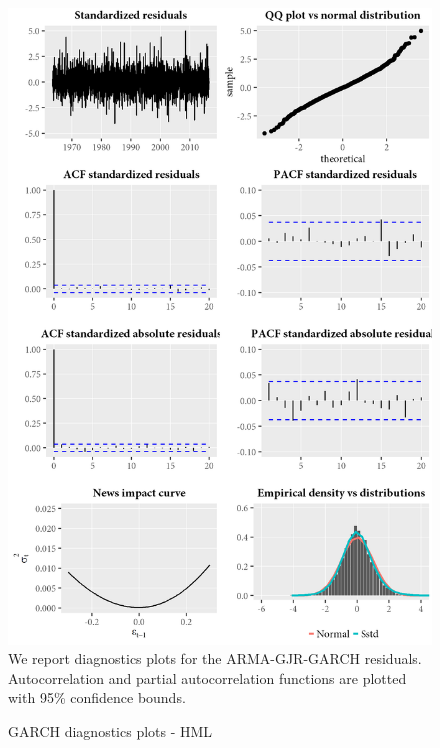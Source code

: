 \begin{figure}[H]
  \caption{GARCH diagnostics plots - HML}
  \label{diag:garchdiagHML}
  \toprule
  \centering
  \begin{minipage}{\textwidth}
  \includegraphics[scale=1]{graphics/garch/garch_diagnosticsHML.png}  
  \bottomrule
  \vspace{3mm}
  \footnotesize
  We report diagnostics plots for the ARMA-GJR-GARCH residuals. Autocorrelation and partial autocorrelation functions are plotted with 95\% confidence bounds.
  \end{minipage}
\end{figure}

